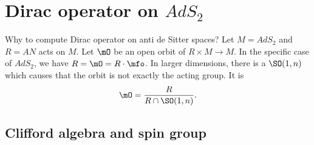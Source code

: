 
\section{Dirac operator on \texorpdfstring{$AdS_2$}{AdS2}}

Why to compute Dirac operator on anti de Sitter spaces? Let $M=AdS_2$ and $R=AN$ acts on $M$. Let $\mO$ be an open orbit of $R\times M\to M$. In the specific case of $AdS_2$, we have $R=\mO=R\cdot\mfo$. In larger dimensions, there is a $\SO(1,n)$ which causes that the orbit is not exactly the acting group. It is
\[
	\mO=\frac{ R }{ R\cap \SO(1,n) }.
\]

\subsection{Clifford algebra and spin group}


